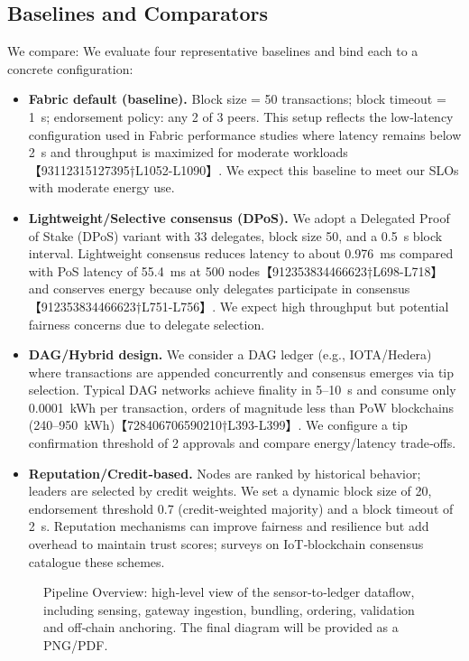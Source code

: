 \subsection{Baselines and Comparators}
We compare:
We evaluate four representative baselines and bind each to a concrete configuration:
\begin{itemize}
  \item \textbf{Fabric default (baseline).}  Block size = 50 transactions; block timeout = 1~s; endorsement policy: any 2 of 3 peers.  This setup reflects the low‑latency configuration used in Fabric performance studies where latency remains below 2~s and throughput is maximized for moderate workloads【93112315127395†L1052-L1090】.  We expect this baseline to meet our SLOs with moderate energy use.
  \item \textbf{Lightweight/Selective consensus (DPoS).}  We adopt a Delegated Proof of Stake (DPoS) variant with 33 delegates, block size 50, and a 0.5~s block interval.  Lightweight consensus reduces latency to about 0.976~ms compared with PoS latency of 55.4~ms at 500 nodes【912353834466623†L698-L718】 and conserves energy because only delegates participate in consensus【912353834466623†L751-L756】.  We expect high throughput but potential fairness concerns due to delegate selection.
  \item \textbf{DAG/Hybrid design.}  We consider a DAG ledger (e.g., IOTA/Hedera) where transactions are appended concurrently and consensus emerges via tip selection.  Typical DAG networks achieve finality in 5–10~s and consume only 0.0001~kWh per transaction, orders of magnitude less than PoW blockchains (240–950~kWh)【728406706590210†L393-L399】.  We configure a tip confirmation threshold of 2 approvals and compare energy/latency trade‑offs.
  \item \textbf{Reputation/Credit‑based.}  Nodes are ranked by historical behavior; leaders are selected by credit weights.  We set a dynamic block size of 20, endorsement threshold 0.7 (credit‑weighted majority) and a block timeout of 2~s.  Reputation mechanisms can improve fairness and resilience but add overhead to maintain trust scores; surveys on IoT‑blockchain consensus catalogue these schemes\cite{morais2023surveyonintegration}.
\end{itemize}

\begin{figure}[!t]
  \centering
  \fbox{\rule{0pt}{1.5in}\rule{0.95\linewidth}{0pt}} %
  \caption{Pipeline Overview: high‑level view of the sensor‑to‑ledger dataflow, including sensing, gateway ingestion, bundling, ordering, validation and off‑chain anchoring. The final diagram will be provided as a PNG/PDF.}
  \label{fig:pipeline-overview}
\end{figure}

